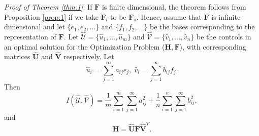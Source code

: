 \documentclass[12pt,onecolumn,draftcls]{IEEEtran}
\newcommand{\bF}{\mathbf{F}}
\begin{document}
\noindent
\textit{Proof of Theorem \ref{thm:1}}: 
\rm If $\bF$ is finite dimensional, the theorem follows from Proposition
\ref{prop:1} if we take $\bF_l$ to be $\bF_s$.  Hence, assume that $\bF$ is infinite dimensional and 
let $\{e_1,e_2,\ldots \}$ and $\{f_1,f_2,\ldots \}$ be the bases corresponding to the representation of $\mathbf{F}$.  Let
$\mathcal{\hat{U}}=\{\hat{u}_1, \ldots, \hat{u}_m\}$ and
$\mathcal{\hat{V}}=\{\hat{v}_1, \ldots, \hat{v}_n\}$
be the controls in an optimal solution for the Optimization Problem ($\mathbf{H,F}$), with corresponding
matrices $\mathbf{\hat{U}}$ and $\mathbf{\hat{V}}$ respectively.   Let
\begin{equation}
\hat{u}_i=\sum_{j=1}^\infty a_{ij}e_j, \; \hat{v}_i=\sum_{j=1}^\infty b_{ij}f_j.
\end{equation}
Then
\begin{equation}
I(\mathcal{\hat{U}},\mathcal{\hat{V}})=
\dfrac{1}{m}\sum_{i=1}^m \sum_{j=1}^\infty a_{ij}^2 + \dfrac{1}{n}\sum_{i=1}^n \sum_{j=1}^\infty b_{ij}^2,
\label{eq:I}
\end{equation}
and
\begin{equation}
\mathbf{H}= \mathbf{\hat{U}} \mathbf{F} \mathbf{\hat{V}}^T.
\end{equation}
\end{document}
